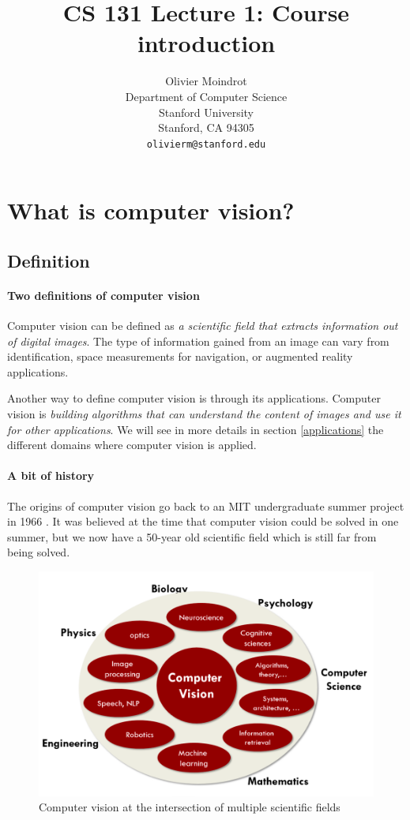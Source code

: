 \documentclass{article}
\title{CS 131 Lecture 1: Course introduction}
\author{
  Olivier Moindrot \\
  Department of Computer Science\\
  Stanford University\\
  Stanford, CA 94305 \\
  \texttt{olivierm@stanford.edu} \\
}
\begin{document}
\maketitle


\section{What is computer vision?}
\subsection{Definition}
\paragraph{Two definitions of computer vision}
Computer vision can be defined as \textit{a scientific field that extracts information out of digital images}. The type of information gained from an image can vary from identification, space measurements for navigation, or augmented reality applications.

Another way to define computer vision is through its applications. Computer vision is \textit{building algorithms that can understand the content of images and use it for other applications}. We will see in more details in section \ref{applications} the different domains where computer vision is applied.

\paragraph{A bit of history}
The origins of computer vision go back to an MIT undergraduate summer project in 1966 \cite{papert1966summer}. It was believed at the time that computer vision could be solved in one summer, but we now have a 50-year old scientific field which is still far from being solved.

\begin{figure}[h]
\begin{center}
\centerline{\includegraphics[width=0.8\columnwidth]{fields.png}}
\caption{Computer vision at the intersection of multiple scientific fields}
\label{fields}
\end{center}
\end{figure} 
\end{document}
